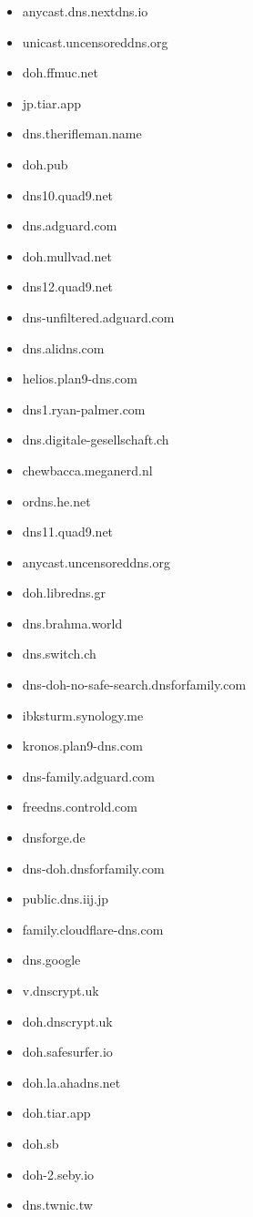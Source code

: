 \begin{itemize}
\item anycast.dns.nextdns.io
\item unicast.uncensoreddns.org
\item doh.ffmuc.net
\item jp.tiar.app
\item dns.therifleman.name
\item doh.pub
\item dns10.quad9.net
\item dns.adguard.com
\item doh.mullvad.net
\item dns12.quad9.net
\item dns-unfiltered.adguard.com
\item dns.alidns.com
\item helios.plan9-dns.com
\item dns1.ryan-palmer.com
\item dns.digitale-gesellschaft.ch
\item chewbacca.meganerd.nl
\item ordns.he.net
\item dns11.quad9.net
\item anycast.uncensoreddns.org
\item doh.libredns.gr
\item dns.brahma.world
\item dns.switch.ch
\item dns-doh-no-safe-search.dnsforfamily.com
\item ibksturm.synology.me
\item kronos.plan9-dns.com
\item dns-family.adguard.com
\item freedns.controld.com
\item dnsforge.de
\item dns-doh.dnsforfamily.com
\item public.dns.iij.jp
\item family.cloudflare-dns.com
\item dns.google
\item v.dnscrypt.uk
\item doh.dnscrypt.uk
\item doh.safesurfer.io
\item doh.la.ahadns.net
\item doh.tiar.app
\item doh.sb
\item doh-2.seby.io
\item dns.twnic.tw

\end{itemize}
